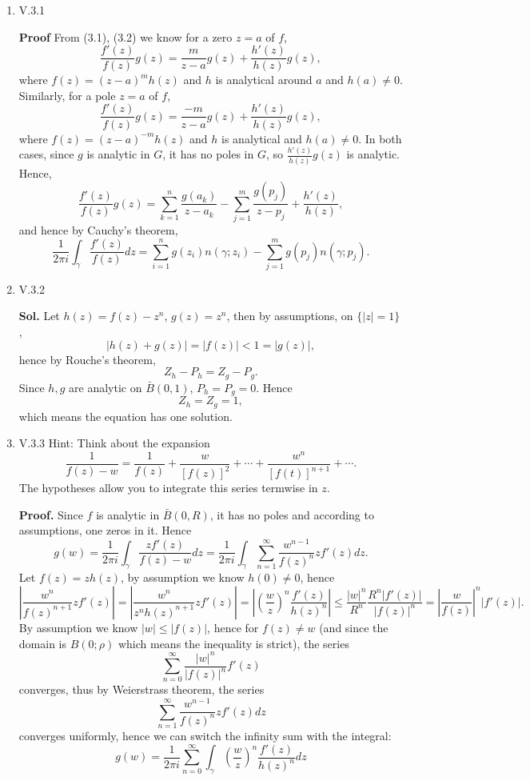 \documentclass{article}%
\begin{document}
\begin{enumerate}


\item V.3.1

\textbf{Proof}
From (3.1), (3.2) we know for a zero $z = a$ of $f$,
$$
\frac{f'(z)}{f(z)}g(z) = \frac{m}{z-a}g(z) + \frac{h'(z)}{h(z)}g(z),
$$
where $f(z) = (z-a)^mh(z) $ and $h$ is analytical around $a$ and $h(a)\ne 0$. Similarly, for a pole $z = a$ of $f$,
$$
\frac{f'(z)}{f(z)}g(z) = \frac{-m}{z-a}g(z)+\frac{h'(z)}{h(z)}g(z),
$$
where $f(z) = (z-a)^{-m}h(z)$ and $h$ is analytical and $h(a)\ne 0$. In both cases, since $g$ is analytic in $G$, it has no poles in $G$, so $\frac{h'(z)}{h(z)}g(z)$ is analytic. Hence, 
$$
\frac{f'(z)}{f(z)}g(z) = \sum_{k=1}^{n}\frac{g(a_k)}{z-a_k} -\sum_{j = 1}^{m}\frac{g(p_j)}{z-p_j}+\frac{h'(z)}{h(z)},
$$
and hence by Cauchy's theorem,
$$
\frac{1}{2\pi i}\int_{\gamma}\frac{f'(z)}{f(z)}dz = \sum_{i=1}^{n}g(z_i)n(\gamma; z_i)-\sum_{j=1}^{m}g(p_j)n(\gamma; p_j).
$$


\item V.3.2

\textbf{Sol.} Let $h(z) = f(z) - z^n $, $g(z) = z^n $, then by assumptions, on $\{|z| = 1\}$,
$$
|h(z)+g(z)| = |f(z)| < 1 = |g(z)|,
$$
hence by Rouche's theorem,
$$
Z_h-P_h = Z_g-P_g.
$$
Since $h, g$ are analytic on $\bar{B}(0, 1)$, $P_h = P_g = 0 $. Hence
$$
Z_h = Z_g = 1,
$$
which means the equation has one solution.


\item V.3.3 Hint: Think about the expansion\[
 \frac{1}{f(z)-w} = \frac{1}{f(z)} + \frac{w}{[f(z)]^2} + \cdots + \frac{w^n}{[f(t)]^{n+1}}+\cdots .                                       
                                       \]The hypotheses allow you to integrate this series termwise in $z$.

\textbf{Proof.} Since $f$ is analytic in $\bar{B}(0, R)$, it has no poles and according to assumptions, one zeros in it. Hence
$$
g(w) = \frac{1}{2\pi i}\int_{\gamma}\frac{zf'(z)}{f(z)-w}dz = \frac{1}{2\pi i}\int_{\gamma}\sum_{n=1}^{\infty}\frac{w^{n-1}}{f(z)^n}zf'(z)dz.
$$
Let $f(z) = zh(z)$, by assumption we know $h(0)\ne 0$, hence
$$
\left|\frac{w^{n}}{f(z)^{n+1}}zf'(z)\right| = \left|\frac{w^{n}}{z^nh(z)^{n+1}}zf'(z)\right| = \left|\left(\frac{w}{z}\right)^n\frac{f'(z)}{h(z)^n}\right| \le \frac{|w|^n}{R^n}\frac{R^n|f'(z)|}{|f(z)|^n} = \left|\frac{w}{f(z)}\right|^n|f'(z)|.
$$
By assumption we know $|w| \le |f(z)|$, hence for $f(z)\ne w$ (and since the domain is $B(0; \rho)$ which means the inequality is strict), the series
$$
\sum_{n=0}^{\infty}\frac{|w|^n}{|f(z)|^n}f'(z)
$$
converges, thus by Weierstrass theorem, the series
$$
\sum_{n=1}^{\infty}\frac{w^{n-1}}{f(z)^n}zf'(z)dz
$$
converges uniformly, hence we can switch the infinity sum with the integral:
$$
g(w) = \frac{1}{2\pi i}\sum_{n=0}^{\infty} \int_{\gamma}\left(\frac{w}{z}\right)^n\frac{f'(z)}{h(z)^n}dz
$$


\end{enumerate}
\end{document}
